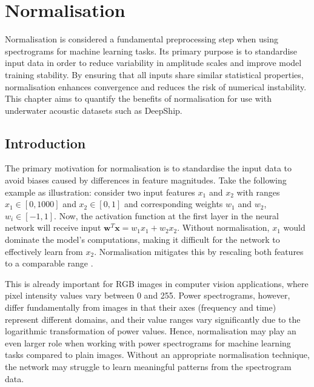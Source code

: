 \chapter{Normalisation}



Normalisation is considered a fundamental preprocessing step when using spectrograms for machine learning tasks. Its primary purpose is to standardise input data in order to reduce variability in amplitude scales and improve model training stability. By ensuring that all inputs share similar statistical properties, normalisation enhances convergence and reduces the risk of numerical instability. This chapter aims to quantify the benefits of normalisation for use with underwater acoustic datasets such as DeepShip.

\section{Introduction}

The primary motivation for normalisation is to standardise the input data to avoid biases caused by differences in feature magnitudes. Take the following example as illustration: consider two input features $x_1$ and $x_2$ with ranges $x_1 \in [0, 1000]$ and $x_2 \in [0, 1]$ and corresponding weights  $w_1$ and $w_2$, $w_i \in [-1, 1]$. Now, the activation function at the first layer in the neural network will receive input $\bm{w}^T \bm{x} = w_1x_1 + w_2x_2$. Without normalisation, $x_1$ would dominate the model's computations, making it difficult for the network to effectively learn from $x_2$. Normalisation mitigates this by rescaling both features to a comparable range \cite{gunes_answer_2020}.

This is already important for RGB images in computer vision applications, where pixel intensity values vary between 0 and 255. Power spectrograms, however, differ fundamentally from images in that their axes (frequency and time) represent different domains, and their value ranges vary significantly due to the logarithmic transformation of power values. Hence, normalisation may play an even larger role when working with power spectrograms for machine learning tasks compared to plain images. Without an appropriate normalisation technique, the network may struggle to learn meaningful patterns from the spectrogram data.


